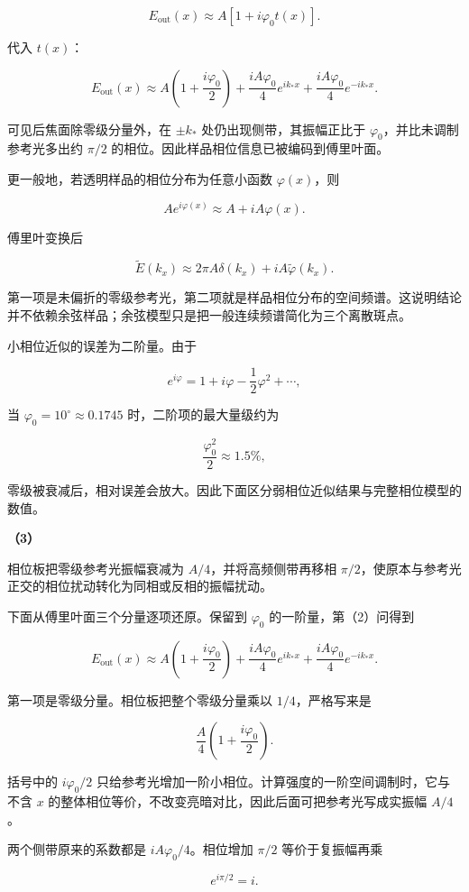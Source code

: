 \documentclass[12pt,a4paper,UTF8]{ctexart}
\begin{document}
\[E_{\mathrm{out}}(x)\approx A\left[1+i\varphi_0t(x)\right].\]

代入 \(t(x)\)：

\[E_{\mathrm{out}}(x)\approx
A\left(1+\frac{i\varphi_0}{2}\right)
+\frac{iA\varphi_0}{4}e^{ik_*x}
+\frac{iA\varphi_0}{4}e^{-ik_*x}.\]

可见后焦面除零级分量外，在 \(\pm k_*\) 处仍出现侧带，其振幅正比于
\(\varphi_0\)，并比未调制参考光多出约 \(\pi/2\)
的相位。因此样品相位信息已被编码到傅里叶面。

更一般地，若透明样品的相位分布为任意小函数 \(\varphi(x)\)，则

\[Ae^{i\varphi(x)}\approx A+iA\varphi(x).\]

傅里叶变换后

\[\widetilde E(k_x)
\approx2\pi A\delta(k_x)
+iA\widetilde\varphi(k_x).\]

第一项是未偏折的零级参考光，第二项就是样品相位分布的空间频谱。这说明结论并不依赖余弦样品；余弦模型只是把一般连续频谱简化为三个离散斑点。

小相位近似的误差为二阶量。由于

\[e^{i\varphi}=1+i\varphi-\frac12\varphi^2+\cdots,\]

当 \(\varphi_0=10^\circ\approx0.1745\) 时，二阶项的最大量级约为

\[\frac{\varphi_0^2}{2}\approx1.5\%,\]

零级被衰减后，相对误差会放大。因此下面区分弱相位近似结果与完整相位模型的数值。

\textbf{（3）}

相位板把零级参考光振幅衰减为 \(A/4\)，并将高频侧带再移相
\(\pi/2\)，使原本与参考光正交的相位扰动转化为同相或反相的振幅扰动。

下面从傅里叶面三个分量逐项还原。保留到 \(\varphi_0\)
的一阶量，第（2）问得到

\[E_{\mathrm{out}}(x)
\approx A\left(1+\frac{i\varphi_0}{2}\right)
+\frac{iA\varphi_0}{4}e^{ik_*x}
+\frac{iA\varphi_0}{4}e^{-ik_*x}.\]

第一项是零级分量。相位板把整个零级分量乘以 \(1/4\)，严格写来是

\[\frac A4\left(1+\frac{i\varphi_0}{2}\right).\]

括号中的 \(i\varphi_0/2\)
只给参考光增加一阶小相位。计算强度的一阶空间调制时，它与不含 \(x\)
的整体相位等价，不改变亮暗对比，因此后面可把参考光写成实振幅 \(A/4\)。

两个侧带原来的系数都是 \(iA\varphi_0/4\)。相位增加 \(\pi/2\)
等价于复振幅再乘

\[e^{i\pi/2}=i.\]
\end{document}
